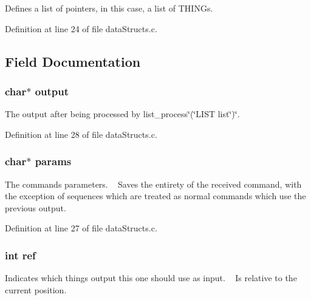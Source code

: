 Defines a list of pointers, in this case, a list of T\+H\+I\+N\+Gs. 

Definition at line 24 of file data\+Structs.\+c.



\subsection{Field Documentation}
\subsubsection[{output}]{\setlength{\rightskip}{0pt plus 5cm}char$\ast$ output}\label{structthing_a47866494eb84961e021291efbea9b569}


The output after being processed by list\+\_\+process\char`\"{}(\char`\"{}L\+I\+ST list\char`\"{})\char`\"{}. 



Definition at line 28 of file data\+Structs.\+c.

\subsubsection[{params}]{\setlength{\rightskip}{0pt plus 5cm}char$\ast$ params}\label{structthing_a0d119d211b6770402e90c832e7d03767}


The command\textquotesingle{}s parameters.  ~\newline
 Saves the entirety of the received command, with the exception of sequences which are treated as normal commands which use the previous\textquotesingle{} output. 



Definition at line 27 of file data\+Structs.\+c.

\subsubsection[{ref}]{\setlength{\rightskip}{0pt plus 5cm}int ref}\label{structthing_adb528a1cb1ca190150183394d082590d}


Indicates which thing\textquotesingle{}s output this one should use as input.  ~\newline
 Is relative to the current position. 



